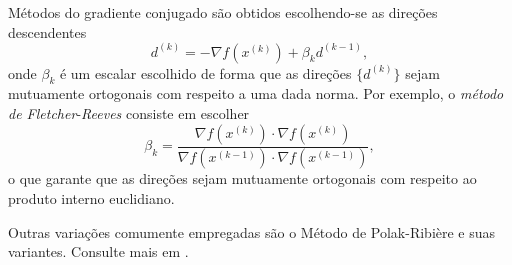 Métodos do gradiente conjugado são obtidos escolhendo-se as direções descendentes
\begin{equation}
  d^{(k)} = -\nabla f(x^{(k)}) + \beta_k d^{(k-1)},
\end{equation}
onde $\beta_k$ é um escalar escolhido de forma que as direções $\{d^{(k)}\}$ sejam mutuamente ortogonais com respeito a uma dada norma. Por exemplo, o \emph{método de Fletcher}-\emph{Reeves} consiste em escolher
\begin{equation}
  \beta_k = \frac{\nabla f(x^{(k)})\cdot\nabla f(x^{(k)})}{\nabla f(x^{(k-1)})\cdot\nabla f(x^{(k-1)})},
\end{equation}
o que garante que as direções sejam mutuamente ortogonais com respeito ao produto interno euclidiano.

\begin{obs}[\hl{Variantes}]
  Outras variações comumente empregadas são o Método de Polak-Ribière e suas variantes. Consulte mais em \cite[Seção 5.2]{Nocedal2006}.
\end{obs}


